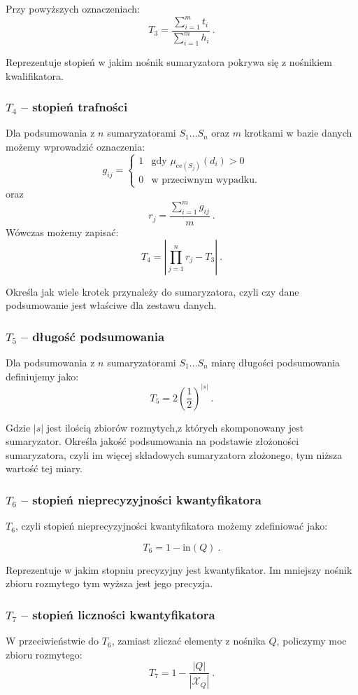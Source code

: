 \documentclass{classrep}
\begin{document}
Przy powyższych oznaczeniach:
\[T_3 = \frac{\sum_{i=1}^{m} t_i}{\sum_{i=1}^{m} h_i} ~\mbox{.}\]

Reprezentuje stopień w jakim nośnik sumaryzatora pokrywa się z nośnikiem kwalifikatora.


\subsubsection{\(T_4\) -- stopień trafności}
Dla podsumowania z \(n\) sumaryzatorami \(S_1 \ldots S_n\)
oraz \(m\) krotkami w bazie danych możemy wprowadzić oznaczenia:
\[g_{ij} = \begin{cases}
1 & \mbox{gdy } \mu_{\mathrm{ce}(S_j)}(d_i) > 0 \\
0 & \mbox{w przeciwnym wypadku.}
\end{cases}\]
oraz
\[r_j = \frac{\sum_{i=1}^{m} g_{ij}}{m} ~\mbox{.}\]
Wówczas możemy zapisać:
\[T_4 = \left| \prod_{j=1}^{n} r_j - T_3\right| ~\mbox{.}\]

 Określa jak wiele krotek przynależy do sumaryzatora, czyli czy dane podsumowanie jest właściwe dla zestawu danych.

\subsubsection{\(T_5\) -- długość podsumowania}
Dla podsumowania z \(n\) sumaryzatorami \(S_1 \ldots S_n\)
miarę długości podsumowania definiujemy jako:
\[T_5 =  2 \left(\frac{1}{2}\right)^{|s|} ~\mbox{.}\]

Gdzie \(|s|\) jest ilością zbiorów rozmytych,z  których skomponowany jest sumaryzator. Określa jakość podsumowania na podstawie złożoności sumaryzatora, czyli im więcej składowych sumaryzatora złożonego, tym niższa wartość tej miary.

\subsubsection{\(T_6\) -- stopień nieprecyzyjności kwantyfikatora}
\(T_6\), czyli stopień nieprecyzyjności kwantyfikatora możemy zdefiniować jako:

\[T_6 = 1-\mathrm{in}(Q) ~\mbox{.}\]

Reprezentuje w jakim stopniu precyzyjny jest kwantyfikator. Im mniejszy nośnik zbioru rozmytego tym wyższa jest jego precyzja.

\subsubsection{\(T_7\) -- stopień liczności kwantyfikatora}
W przeciwieństwie do \(T_6\), zamiast zliczać elementy z nośnika \(Q\),
policzymy moc zbioru rozmytego:
\[T_7 = 1-\frac{|Q|}{|\mathcal{X}_Q|} ~\mbox{.}\]
\end{document}
